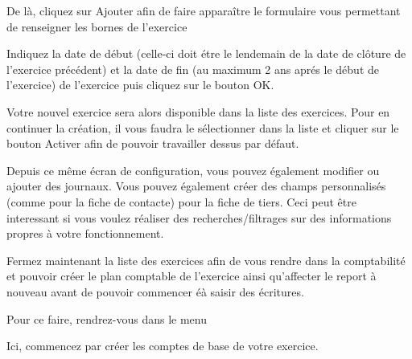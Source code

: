 \documentclass[a4paper,10pt,oneside,french]{sphinxmanual}
\begin{document}
De là, cliquez sur Ajouter afin de faire apparaître le formulaire vous permettant de renseigner les bornes de l’exercice
\begin{quote}

\noindent{}
\end{quote}

Indiquez la date de début (celle-ci doit étre le lendemain de la date
de clôture de l’exercice précédent) et la date de fin (au maximum 2 ans
aprés le début de l’exercice) de l’exercice puis cliquez sur le bouton
OK.

Votre nouvel exercice sera alors disponible dans la
liste des exercices. Pour en continuer la création, il vous faudra le
sélectionner dans la liste et cliquer sur le bouton Activer afin de
pouvoir travailler dessus par défaut.

Depuis ce même écran de configuration, vous pouvez également modifier
ou ajouter des journaux.
Vous pouvez également créer des champs personnalisés (comme pour la fiche de contacte)
pour la fiche de tiers. Ceci peut être interessant si vous voulez réaliser des recherches/filtrages
sur des informations propres à votre fonctionnement.

Fermez maintenant la liste des exercices afin de vous rendre dans la comptabilité et
pouvoir créer le plan comptable de l’exercice ainsi qu’affecter le
report à nouveau avant de pouvoir commencer éà saisir des écritures.

Pour ce faire, rendrez-vous dans le menu 
\begin{quote}

\noindent{}
\end{quote}

Ici, commencez par créer les comptes de base de votre exercice.
\end{document}

